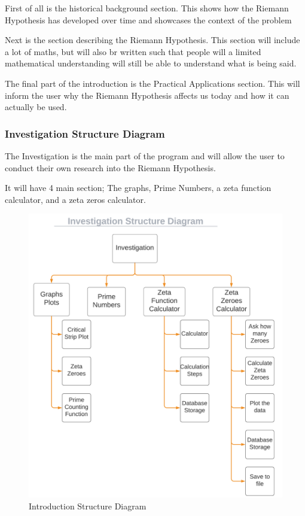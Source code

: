 \documentclass{article}
\begin{document}
First of all is the historical background section. This shows how the Riemann Hypothesis has developed over time and showcases the context of the problem

Next is the section describing the Riemann Hypothesis. This section will include a lot of maths, but will also br written such that people will a limited mathematical understanding will still be able to understand what is being said.

The final part of the introduction is the Practical Applications section. This will inform the user why the Riemann Hypothesis affects us today and how it can actually be used.


\clearpage
\subsubsection{Investigation Structure Diagram}
The Investigation is the main part of the program and will allow the user to conduct their own research into the Riemann Hypothesis.

It will have 4 main section; The graphs, Prime Numbers, a zeta function calculator, and a zeta zeros calculator.

\begin{figure}[h]
    \centering
    \captionsetup{justification=centering}
    \includegraphics[scale=0.5]{investigation-structure-diagram}
    \caption{Introduction Structure Diagram}
\end{figure}
\end{document}

